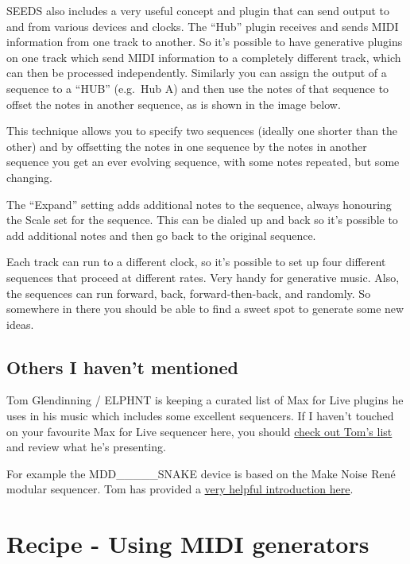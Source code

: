\documentclass[
  12pt,
  letterpaper,
  oneside,
  open=any]{scrbook}
\makeatletter
\newcommand*\pandocbounded[1]{%
  \sbox\pandoc@box{#1}%
  \Gscale@div\@tempa{\textheight}{\dimexpr\ht\pandoc@box+\dp\pandoc@box\relax}%
  \Gscale@div\@tempb{\linewidth}{\wd\pandoc@box}%
  \ifdim\@tempb\p@<\@tempa\p@\let\@tempa\@tempb\fi%
  \ifdim\@tempa\p@<\p@\scalebox{\@tempa}{\usebox\pandoc@box}%
  \else\usebox{\pandoc@box}%
  \fi%
}
\makeatother
\begin{document}
SEEDS also includes a very useful concept and plugin that can send
output to and from various devices and clocks. The ``Hub'' plugin
receives and sends MIDI information from one track to another. So it's
possible to have generative plugins on one track which send MIDI
information to a completely different track, which can then be processed
independently. Similarly you can assign the output of a sequence to a
``HUB'' (e.g.~Hub A) and then use the notes of that sequence to offset
the notes in another sequence, as is shown in the image below.

\pandocbounded{\texttt{[image: images/Polymath\_offset.png]}}

This technique allows you to specify two sequences (ideally one shorter
than the other) and by offsetting the notes in one sequence by the notes
in another sequence you get an ever evolving sequence, with some notes
repeated, but some changing.

The ``Expand'' setting adds additional notes to the sequence, always
honouring the Scale set for the sequence. This can be dialed up and back
so it's possible to add additional notes and then go back to the
original sequence.

Each track can run to a different clock, so it's possible to set up four
different sequences that proceed at different rates. Very handy for
generative music. Also, the sequences can run forward, back,
forward-then-back, and randomly. So somewhere in there you should be
able to find a sweet spot to generate some new ideas.

\section{Others I haven't mentioned}\label{others-i-havent-mentioned}

Tom Glendinning / ELPHNT is keeping a curated list of Max for Live
plugins he uses in his music which includes some excellent sequencers.
If I haven't touched on your favourite Max for Live sequencer here, you
should \href{https://elphnt.io/max-for-live-curated/}{check out Tom's
list} and review what he's presenting.

For example the MDD\_\_\_\_\_SNAKE device is based on the Make Noise
René modular sequencer. Tom has provided a
\href{https://www.youtube.com/watch?v=v2_mdrz9XrU}{very helpful
introduction here}.


\chapter{Recipe - Using MIDI
generators}\label{013-Recipe-MIDI_generators}
\end{document}
